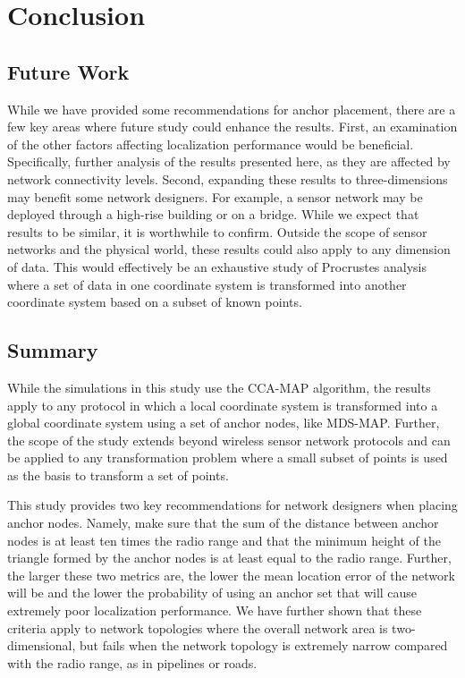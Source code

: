 \chapter{Conclusion}

\section{Future Work}
While we have provided some recommendations for anchor placement, there are a few key areas where future study could enhance the results.  First, an examination of the other factors affecting localization performance would be beneficial.  Specifically, further analysis of the results presented here, as they are affected by network connectivity levels.  Second, expanding these results to three-dimensions may benefit some network designers.  For example, a sensor network may be deployed through a high-rise building or on a bridge.  While we expect that results to be similar, it is worthwhile to confirm.  Outside the scope of sensor networks and the physical world, these results could also apply to any dimension of data.  This would effectively be an exhaustive study of Procrustes analysis where a set of data in one coordinate system is transformed into another coordinate system based on a subset of known points.

\section{Summary}
While the simulations in this study use the CCA-MAP algorithm, the results apply to any protocol in which a local coordinate system is transformed into a global coordinate system using a set of anchor nodes, like MDS-MAP.  Further, the scope of the study extends beyond wireless sensor network protocols and can be applied to any transformation problem where a small subset of points is used as the basis to transform a set of points.

This study provides two key recommendations for network designers when placing anchor nodes.  Namely, make sure that the sum of the distance between anchor nodes is at least ten times the radio range and that the minimum height of the triangle formed by the anchor nodes is at least equal to the radio range.  Further, the larger these two metrics are, the lower the mean location error of the network will be and the lower the probability of using an anchor set that will cause extremely poor localization performance.  We have further shown that these criteria apply to network topologies where the overall network area is two-dimensional, but fails when the network topology is extremely narrow compared with the radio range, as in pipelines or roads.

